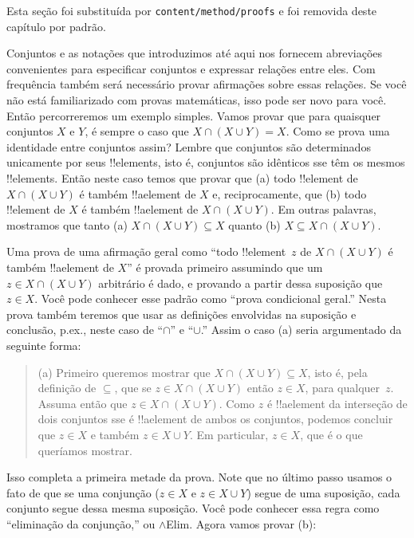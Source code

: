 \documentclass[../../../include/open-logic-section]{subfiles}
\begin{document}

\begin{editorial}
Esta seção foi substituída por \verb|content/method/proofs| e foi
removida deste capítulo por padrão.
\end{editorial}

\begin{explain}
Conjuntos e as notações que introduzimos até aqui nos fornecem
abreviações convenientes para especificar conjuntos e expressar relações
entre eles. Com frequência também será necessário provar afirmações sobre
essas relações. Se você não está familiarizado com provas matemáticas,
isso pode ser novo para você. Então percorreremos um exemplo simples. Vamos
provar que para quaisquer conjuntos $X$ e $Y$, é sempre o caso que $X \cap
(X \cup Y) = X$. Como se prova uma identidade entre conjuntos assim?
Lembre que conjuntos são determinados unicamente por seus !!{element}s, isto é,
conjuntos são idênticos sse têm os mesmos !!{element}s. Então neste
caso temos que provar que (a) todo !!{element} de $X \cap (X \cup
Y)$ é também !!a{element} de $X$ e, reciprocamente, que (b) todo
!!{element} de $X$ é também !!a{element} de $X \cap (X \cup Y)$. Em
outras palavras, mostramos que tanto (a) $X \cap (X \cup Y) \subseteq X$ quanto
(b) $X \subseteq X \cap (X \cup Y)$.

Uma prova de uma afirmação geral como ``todo !!{element}~$z$ de $X \cap (X
\cup Y)$ é também !!a{element} de $X$'' é provada primeiro assumindo
que um $z \in X \cap (X \cup Y)$ arbitrário é dado, e provando a partir
dessa suposição que $z \in X$. Você pode conhecer esse padrão como ``prova
condicional geral.'' Nesta prova também teremos que usar as
definições envolvidas na suposição e conclusão, p.ex., neste
caso de ``$\cap$'' e ``$\cup$.'' Assim o caso (a) seria argumentado da
seguinte forma:

\begin{quote}
(a) Primeiro queremos mostrar que $X \cap (X \cup Y) \subseteq X$, isto é,
pela definição de $\subseteq$, que se $z \in X \cap (X \cup Y)$ então
$z \in X$, para qualquer~$z$. Assuma então que $z \in X \cap (X \cup
Y)$. Como $z$ é !!a{element} da interseção de dois conjuntos sse
é !!a{element} de ambos os conjuntos, podemos concluir que $z \in X$ e
também $z \in X \cup Y$. Em particular, $z \in X$, que é o que
queríamos mostrar.
\end{quote}

Isso completa a primeira metade da prova. Note que no último
passo usamos o fato de que se uma conjunção ($z \in X$ e $z \in X
\cup Y$) segue de uma suposição, cada conjunto segue dessa mesma suposição. Você pode conhecer essa regra como ``eliminação da conjunção,'' ou $\land$Elim. Agora vamos provar (b):


\end{explain}
\end{document}
